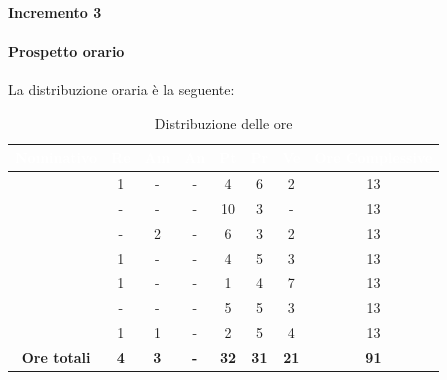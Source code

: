 \paragraph{Incremento 3}
\paragraph*{Prospetto orario}
La distribuzione oraria è la seguente:
\begin{table}[H]
	\begin{center}
		\begin{tabular}{ |c c c c c c c c| }
			\rowcolor{darkblue} 
			\textcolor{white}{\textbf{Nominativo}} & \textcolor{white}{\textbf{Re}} & \textcolor{white}{\textbf{Am}} & \textcolor{white}{\textbf{An}} & \textcolor{white}{\textbf{Pt}} & \textcolor{white}{\textbf{Pr}} & \textcolor{white}{\textbf{Ve}} & \textcolor{white}{\textbf{Ore Complessive}} \\ \hline
			\BL 	& 1  	& -  	& - 	& 4 	& 6 	& 2 	& 13 \\ \hline
		\FF 	& -  	& -  	& - 	& 10 	& 3 	& -  	& 13 \\ \hline
		\MM 	& -  	& 2  	& - 	& 6 	& 3 	& 2 	& 13 \\ \hline
		\PC 	& 1 	& -  	& - 	& 4 	& 5 	& 3 	& 13 \\ \hline
		\TG 	& 1  	& -		& - 	& 1 	& 4 	& 7 	& 13 \\ \hline
		\TL 	& -  	& - 	& - 	& 5 	& 5 	& 3 	& 13 \\ \hline
		\VD 	& 1  	& 1  	& - 	& 2 	& 5 	& 4 	& 13 \\ \hline
		\textbf{Ore totali} & \textbf{4} & \textbf{3} & \textbf{-} & \textbf{32} & \textbf{31} & \textbf{21} & \textbf{91} \\ \hline
		\end{tabular}
		\caption{Distribuzione delle ore}
	\end{center}
\end{table}
